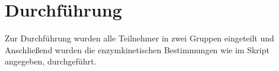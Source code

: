 \newpage
\section{Durchführung}
Zur Durchführung wurden alle Teilnehmer in zwei Gruppen eingeteilt und Anschließend wurden die enzymkinetischen Bestimmungen wie im Skript \cite{enzymkinetik} angegeben, durchgeführt.
\vspace{1.5cm} 
 
 


